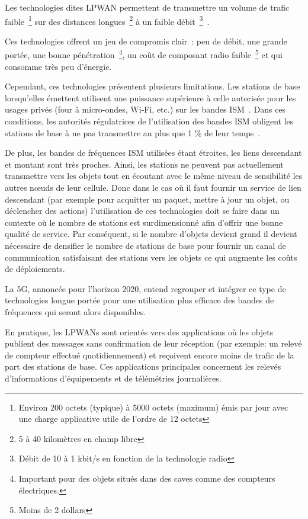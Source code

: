 Les technologies dites \ac{LPWAN} permettent de transmettre un volume de trafic faible~\footnote{Environ 200 octets (typique) à 5000 octets (maximum) émis par jour avec une charge applicative utile de l'ordre de 12 octets} sur des distances longues~\footnote{5 à 40 kilomètres en champ libre} à un faible débit~\footnote{Débit de 10 à 1 kbit/s en fonction de la technologie radio}~\cite{xiong2015low}.

Ces technologies offrent un jeu de compromis clair~: peu de débit, une grande portée, une bonne pénétration~\footnote{Important pour des objets situés dans des caves comme des compteurs électriques.}, un coût de composant radio faible~\footnote{Moins de 2 dollars} et qui consomme très peu d'énergie.

Cependant, ces technologies présentent plusieurs limitations.
Les stations de base lorsqu'elles émettent utilisent une puissance supérieure à celle autorisée pour les usages privés (four à micro-ondes, Wi-Fi, etc.) sur les bandes \ac{ISM}~\cite{rec200170}.
Dans ces conditions, les autorités régulatrices de l'utilisation des bandes \ac{ISM} obligent les stations de base à ne pas transmettre au plus que 1 \% de leur temps~\cite{vangelista2015long}.

De plus, les bandes de fréquences \ac{ISM} utilisées étant étroites, les liens descendant et montant sont très proches.
Ainsi, les stations ne peuvent pas actuellement transmettre vers les objets tout en écoutant avec le même niveau de sensibilité les autres nœuds de leur cellule.
Donc dans le cas où il faut fournir un service de lien descendant (par exemple pour acquitter un paquet, mettre à jour un objet, ou déclencher des actions) l'utilisation de ces technologies doit se faire dans un contexte où le nombre de stations est surdimensionné afin d'offrir une bonne qualité de service.
Par conséquent, si le nombre d'objets devient grand il devient nécessaire de densifier le nombre de stations de base pour fournir un canal de communication satisfaisant des stations vers les objets ce qui augmente les coûts de déploiements.

La 5G, annoncée pour l'horizon 2020, entend regrouper et intégrer ce type de technologies longue portée pour une utilisation plus efficace des bandes de fréquences qui seront alors disponibles.

En pratique, les \ac{LPWAN}s sont orientés vers des applications où les objets publient des messages sans confirmation de leur réception (par exemple: un relevé de compteur effectué quotidiennement) et reçoivent encore moins de trafic de la part des stations de base.
Ces applications principales concernent les relevés d'informations d'équipements et de télémétries journalières.

